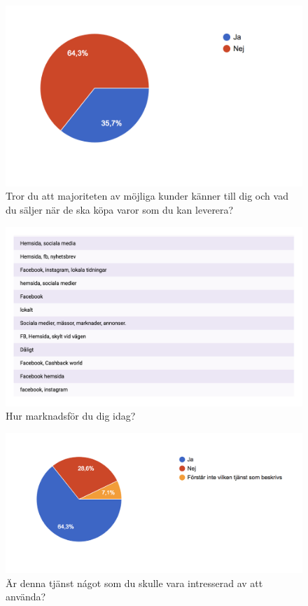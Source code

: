 \documentclass[10pt,a4paper,oneside]{article}
\begin{document}
\begin{figure}
	\includegraphics[scale=0.6]{7.png}
	\caption{Tror du att majoriteten av m\"ojliga kunder k\"anner till dig och vad du s\"aljer när de ska k\"opa varor som du kan leverera?}
\end{figure}

\begin{figure}
	\includegraphics[scale=0.6]{8.png}
	\caption{Hur marknadsf\"or du dig idag?}
\end{figure}

\begin{figure}
	\includegraphics[scale=0.6]{9.png}
	\caption{\"Ar denna tj\"anst n\'agot som du skulle vara intresserad av att anv\"anda?}
\end{figure}
\end{document}
